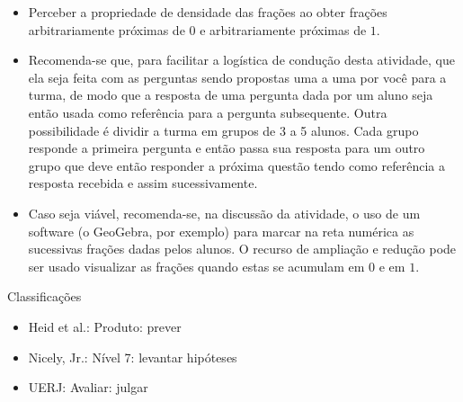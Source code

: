 \documentclass[oneside]{book}
\begin{document}
\begin{multicols}{2}
\begin{itemize} %
    \item       Perceber a propriedade de densidade das frações ao obter frações 
arbitrariamente próximas de       $0$       e arbitrariamente próximas de       
$1$.
\end{itemize} %
  
  
 
\begin{itemize} %
    \item       Recomenda-se que, para facilitar a logística de condução desta 
atividade, que ela seja feita com as perguntas sendo propostas uma a uma por 
você para a turma, de modo que a resposta de uma pergunta dada por um aluno seja 
então usada como referência para a pergunta subsequente. Outra possibilidade é 
dividir a turma em grupos de 3 a 5 alunos. Cada grupo responde a primeira 
pergunta e então passa sua resposta para um outro grupo que deve então responder 
a próxima questão tendo como referência a resposta recebida e assim 
sucessivamente.
    \item       Caso seja viável, recomenda-se, na discussão da atividade, o uso 
de um software (o GeoGebra, por exemplo) para marcar na reta numérica as 
sucessivas frações dadas pelos alunos. O recurso de ampliação e redução pode ser 
usado visualizar as frações quando estas se acumulam em       $0$       e em     
  $1$.
\end{itemize} %
  
  
  Classificações  
\begin{itemize} %
    \item       Heid et al.: Produto: prever
    \item       Nicely, Jr.: Nível 7: levantar hipóteses
    \item       UERJ: Avaliar: julgar
\end{itemize} %


\end{multicols}
\end{document}
